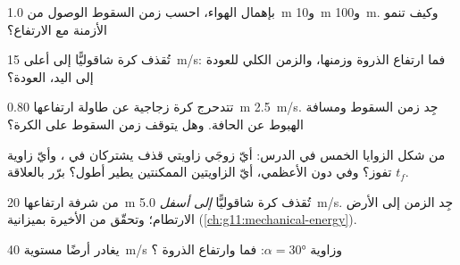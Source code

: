 \begin{exercise}[$\star$]\label{exo:g12:projectile-motion:3}
بإهمال الهواء، احسب زمن السقوط  الوصول من \qty{1.0}{m}
و\qty{10}{m} و\qty{100}{m}. وكيف تنمو الأزمنة مع الارتفاع؟
\end{exercise}

\begin{exercise}[$\star$]\label{exo:g12:projectile-motion:4}
تُقذف كرة شاقوليًّا إلى أعلى  \qty{15}{m/s}: فما ارتفاع الذروة وزمنها،
والزمن الكلي للعودة إلى اليد،  العودة؟
\end{exercise}

\begin{exercise}[$\star$]\label{exo:g12:projectile-motion:5}
تتدحرج كرة زجاجية عن طاولة ارتفاعها \qty{0.80}{m}  \qty{2.5}{m/s}. جِد
زمن السقوط ومسافة الهبوط عن الحافة. وهل يتوقف زمن السقوط
على  الكرة؟
\end{exercise}

\begin{exercise}[$\star\star$]\label{exo:g12:projectile-motion:6}
من شكل الزوايا الخمس في الدرس: أيّ زوجَي زاويتي قذف
يشتركان في ، وأيّ زاوية تفوز؟ وفي  دون الأعظمي،
أيّ الزاويتين الممكنتين يطير أطول؟ برّر بالعلاقة $t_f$.
\end{exercise}

\begin{exercise}[$\star\star$]\label{exo:g12:projectile-motion:7}
من شرفة ارتفاعها \qty{20}{m} تُقذف كرة شاقوليًّا \emph{إلى أسفل} 
\qty{5.0}{m/s}. جِد الزمن إلى الأرض  الارتطام؛ وتحقّق
من الأخيرة بميزانية  (\cref{ch:g11:mechanical-energy}).
\end{exercise}

\begin{exercise}[$\star\star$]\label{exo:g12:projectile-motion:8}
يغادر  أرضًا مستوية  \qty{40}{m/s} وزاوية $\alpha = \ang{30}$:
فما  وارتفاع الذروة ؟
\end{exercise}

